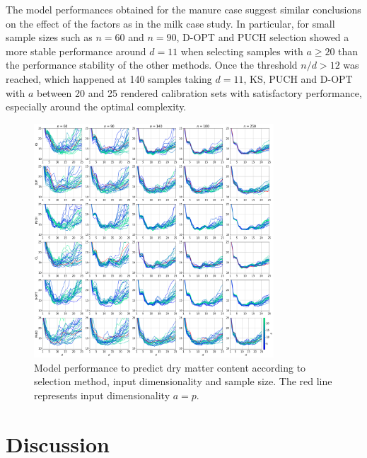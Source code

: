 \documentclass[journal=ancham,manuscript=article]{achemso}
\begin{document}
The model performances obtained for the manure case suggest similar conclusions on the effect of the factors as in the milk case study. In particular, for small sample sizes such as $n=60$ and $n=90$, D-OPT and PUCH selection showed a more stable performance around $d = 11$ when selecting samples with $a \ge 20$ than the performance stability of the other methods. Once the threshold $n/d>12$ was reached, which happened at 140 samples taking $d=11$, KS, PUCH and D-OPT with $a$ between 20 and 25 rendered calibration sets with satisfactory performance, especially around the optimal complexity. 



\begin{figure}[b]
\includegraphics[width=0.8\textwidth]{manuscript/figures/d02_manure_model_performance.png}
\centering
\caption{Model performance to predict dry matter content according to selection method, input dimensionality and sample size. The red line represents input dimensionality $a=p$.}
\label{fig_d02_manure_model_performance}
\end{figure}




\section*{Discussion}\label{discussion}
\end{document}
